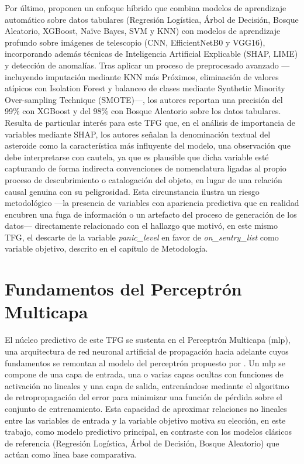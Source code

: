 \documentclass[12pt]{report} %
\begin{document}
Por último, \cite{mondal2025multimodel} proponen un enfoque híbrido que combina modelos de aprendizaje automático sobre datos tabulares (Regresión Logística, Árbol de Decisión, Bosque Aleatorio, XGBoost, Naïve Bayes, SVM y KNN) con modelos de aprendizaje profundo sobre imágenes de telescopio (CNN, EfficientNetB0 y VGG16), incorporando además técnicas de Inteligencia Artificial Explicable (SHAP, LIME) y detección de anomalías. Tras aplicar un proceso de preprocesado avanzado ---incluyendo imputación mediante KNN más Próximos, eliminación de valores atípicos con Isolation Forest y balanceo de clases mediante Synthetic Minority Over-sampling Technique (SMOTE)---, los autores reportan una precisión del 99\% con XGBoost y del 98\% con Bosque Aleatorio sobre los datos tabulares. Resulta de particular interés para este TFG que, en el análisis de importancia de variables mediante SHAP, los autores señalan la denominación textual del asteroide como la característica más influyente del modelo, una observación que debe interpretarse con cautela, ya que es plausible que dicha variable esté capturando de forma indirecta convenciones de nomenclatura ligadas al propio proceso de descubrimiento o catalogación del objeto, en lugar de una relación causal genuina con su peligrosidad. Esta circunstancia ilustra un riesgo metodológico ---la presencia de variables con apariencia predictiva que en realidad encubren una fuga de información o un artefacto del proceso de generación de los datos--- directamente relacionado con el hallazgo que motivó, en este mismo TFG, el descarte de la variable \textit{panic\_level} en favor de \textit{on\_sentry\_list} como variable objetivo, descrito en el capítulo de Metodología.

\section{Fundamentos del Perceptrón Multicapa}

El núcleo predictivo de este TFG se sustenta en el Perceptrón Multicapa (\gls{mlp}), una arquitectura de red neuronal artificial de propagación hacia adelante cuyos fundamentos se remontan al modelo del perceptrón propuesto por \cite{rosenblatt1958perceptron}. Un \gls{mlp} se compone de una capa de entrada, una o varias capas ocultas con funciones de activación no lineales y una capa de salida, entrenándose mediante el algoritmo de retropropagación del error para minimizar una función de pérdida sobre el conjunto de entrenamiento. Esta capacidad de aproximar relaciones no lineales entre las variables de entrada y la variable objetivo motiva su elección, en este trabajo, como modelo predictivo principal, en contraste con los modelos clásicos de referencia (Regresión Logística, Árbol de Decisión, Bosque Aleatorio) que actúan como línea base comparativa.
\end{document}
